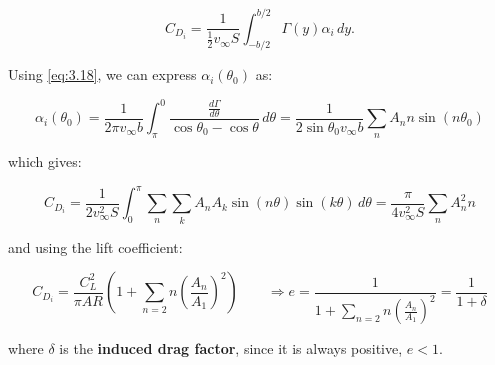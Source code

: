 \documentclass[british,french,11pt, a4paper, openany]{article}
\begin{document}
\begin{equation}
C_{D_i} = \frac{1}{\frac{1}{2} v_\infty S} \int _{-b/2} ^{b/2} \Gamma (y)\alpha _i \, dy. 
\end{equation}

Using \eqref{eq:3.18}, we can express $\alpha _i (\theta _0)$ as:

\begin{equation}
\alpha _i (\theta _0) = \frac{1}{2\pi v_\infty b} \int ^{0}_{\pi} \frac{\frac{d\Gamma }{d\theta}}{\cos \theta _0 - \cos \theta} \, d\theta = \frac{1}{2\sin \theta _0 v_\infty b} \sum _n A_n n \sin (n \theta _0)
\end{equation}

which gives:

\begin{equation}
C_{D_i} = \frac{1}{2v_\infty ^2 S} \int _0 ^\pi \sum _n \sum _k A_n A_k \sin (n\theta) \sin (k\theta) \, d\theta = \frac{\pi}{4v_\infty ^2 S} \sum _n A_n ^2 n
\end{equation}

and using the lift coefficient:

\begin{equation}
C_{D_i} = \frac{C_L^2}{\pi AR}  \left(1+\sum _{n=2} n \left(\frac{A_n}{A_1}\right)^2 \right) \qquad \Rightarrow e = \frac{1}{1+\sum _{n=2} n \left(\frac{A_n}{A_1}\right)^2} = \frac{1}{1+\delta}
\end{equation}

where $\delta $ is the \textbf{induced drag factor}, since it is always positive, $e<1$. 
\end{document}
